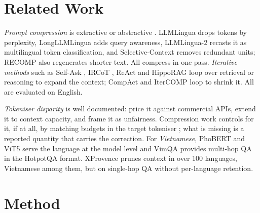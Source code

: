 \documentclass[runningheads]{llncs}
\begin{document}
\section{Related Work}
\emph{Prompt compression} is extractive or abstractive
\cite{li2025promptcompression}. LLMLingua \cite{jiang2023llmlingua} drops tokens
by perplexity, LongLLMLingua \cite{jiang2024longllmlingua} adds query
awareness, LLMLingua-2 \cite{pan2024llmlingua2} recasts it as multilingual token
classification, and Selective-Context \cite{li2023selectivecontext} removes
redundant units; RECOMP \cite{xu2024recomp} also regenerates shorter text. All
compress in one pass. \emph{Iterative methods} such as Self-Ask
\cite{press2023selfask}, IRCoT \cite{trivedi2023ircot}, ReAct
\cite{yao2023react} and HippoRAG \cite{gutierrez2024hipporag} loop over retrieval
or reasoning to expand the context; CompAct \cite{yoon2024compact} and IterCOMP
loop to shrink it. All are evaluated on English.

\emph{Tokeniser disparity} is well documented: \cite{ahia2023allcost} price it
against commercial APIs, \cite{somide2026african} extend it to context capacity,
and \cite{petrov2023tokenizers} frame it as unfairness. Compression work
controls for it, if at all, by matching budgets in the target tokeniser
\cite{lukauskas2026lost}; what is missing is a reported quantity that carries
the correction. For \emph{Vietnamese}, PhoBERT \cite{nguyen2020phobert} and ViT5
\cite{phan2022vit5} serve the language at the model level and VimQA
\cite{le2022vimqa} provides multi-hop QA in the HotpotQA format. XProvence
\cite{mohamed2026xprovence} prunes context in over 100 languages, Vietnamese
among them, but on single-hop QA without per-language retention.

\section{Method}
\end{document}
